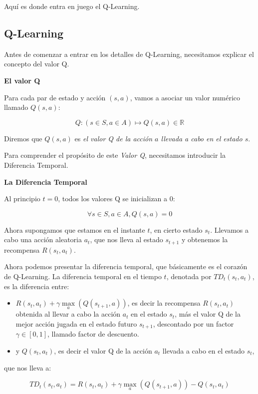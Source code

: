 \documentclass[
]{book}
\begin{document}
Aquí es donde entra en juego el Q-Learning.

\hypertarget{q-learning}{%
\subsection{Q-Learning}\label{q-learning}}

Antes de comenzar a entrar en los detalles de Q-Learning, necesitamos explicar el concepto del valor Q.

\textbf{El valor Q}

Para cada par de estado y acción \((s, a)\), vamos a asociar un valor numérico llamado \(Q (s, a)\):

\[Q: (s \in S, a \in A) \mapsto Q(s,a) \in \mathbb{R}\]

Diremos que \(Q (s, a)\) es \emph{el valor Q de la acción \(a\) llevada a cabo en el estado \(s\)}.

Para comprender el propósito de este \emph{Valor Q}, necesitamos introducir la Diferencia Temporal.

\textbf{La Diferencia Temporal}

Al principio \(t = 0\), todos los valores Q se inicializan a 0:

\[\forall s \in S, a \in A, Q(s,a) = 0\]

Ahora supongamos que estamos en el instante \(t\), en cierto estado \(s_t\). Llevamos a cabo una acción aleatoria \(a_t\), que nos lleva al estado \(s_{t + 1}\) y obtenemos la recompensa \(R(s_t, a_t)\).

Ahora podemos presentar la diferencia temporal, que básicamente es el corazón de Q-Learning. La diferencia temporal en el tiempo \(t\), denotada por \(TD_t(s_t, a_t)\), es la diferencia entre:

\begin{itemize}
\item
  \(R(s_t,a_t) + \gamma \underset{a}{\max}(Q(s_{t+1},a))\), es decir la recompensa \(R (s_t, a_t)\) obtenida al llevar a cabo la acción \(a_t\) en el estado \(s_t\), más el valor Q de la mejor acción jugada en el estado futuro \(s_{t+1}\), descontado por un factor \(\gamma \in [0,1]\), llamado factor de descuento.
\item
  y \(Q(s_t, a_t)\), es decir el valor Q de la acción \(a_t\) llevada a cabo en el estado \(s_t\),
\end{itemize}

que nos lleva a:

\[TD_t(s_t,a_t) = R(s_t,a_t) + \gamma \underset{a}{\max}(Q(s_{t+1},a)) - Q(s_t,a_t)\]
\end{document}

